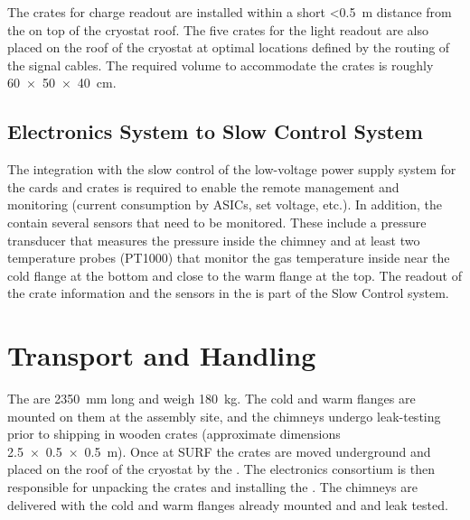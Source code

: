 The  crates for charge readout %
are installed within a short \SI{<0.5}{\meter} distance from the  on top of the cryostat roof. The five  crates for the light readout are also placed on the roof of the cryostat at optimal locations defined by the routing of the  signal cables. The required volume to accommodate the crates is roughly \SI[product-units=power]{60x50x40}{\cm}. 

\subsection{Electronics System to Slow Control System}
\label{sec:fddp-tpc-elec-intfc-sc}

The integration with the slow control of the low-voltage power supply system for the  cards and  crates is required to enable the remote management and monitoring (current consumption by ASICs, set voltage, etc.). In addition, the  contain several sensors that need to be monitored. These include a pressure transducer that measures the pressure inside the chimney and at least two temperature probes (PT1000) that monitor the gas temperature inside near the cold flange at the bottom and close to the warm flange at the top. The readout of the  crate information and the sensors in the  is part of the Slow Control system.

\section{Transport and Handling}
\label{sec:fddp-tpc-elec-install-transport}

The  are \SI{2350}{\mm} long %
and weigh \SI{180}{\kg}.  The cold and warm flanges are mounted on them at the assembly site, and the chimneys undergo leak-testing prior to shipping in wooden crates (approximate dimensions \SI[product-units=power]{2.5x0.5x0.5}{m}). %
Once at SURF the crates are moved underground and placed on the roof of the cryostat by the . The %
\dual electronics consortium %
is then responsible for unpacking the crates and installing the . The chimneys are delivered with the cold and warm flanges already mounted and and leak tested. %

